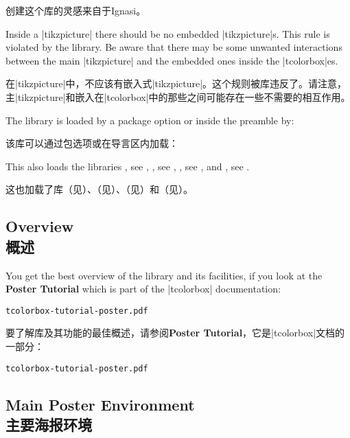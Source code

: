 创建这个库的灵感来自于Ignasi。
\begin{marker}
Inside a |tikzpicture| there should be no embedded |tikzpicture|s.
This rule is violated by the  library. Be aware that there
may be some unwanted interactions between the main |tikzpicture| and
the embedded ones inside the |tcolorbox|es.

在|tikzpicture|中，不应该有嵌入式|tikzpicture|。这个规则被库违反了。请注意，主|tikzpicture|和嵌入在|tcolorbox|中的那些之间可能存在一些不需要的相互作用。
\end{marker}

The library is loaded by a package option or inside the preamble by:

该库可以通过包选项或在导言区内加载：
\begin{dispListing}
\end{dispListing}
This also loads the libraries
, see ,
, see ,
, see , and
, see .

这也加载了库（见）、（见）、（见）和（见）。
\subsection{Overview\\概述}\label{subsec:poster_overview}


\begin{tcolorbox}[base example,hyperurl={tcolorbox-tutorial-poster.pdf},title=Click me to see the tutorial]
You get the best overview of the  library and its facilities,
if you look at the \textbf{Poster Tutorial} which is part of the |tcolorbox|
documentation:\par
\texttt{tcolorbox-tutorial-poster.pdf}

要了解库及其功能的最佳概述，请参阅\textbf{Poster Tutorial}，它是|tcolorbox|文档的一部分：\par
\texttt{tcolorbox-tutorial-poster.pdf}
\end{tcolorbox}



%
\subsection{Main Poster Environment\\主要海报环境}\label{subsec:poster_environment}

